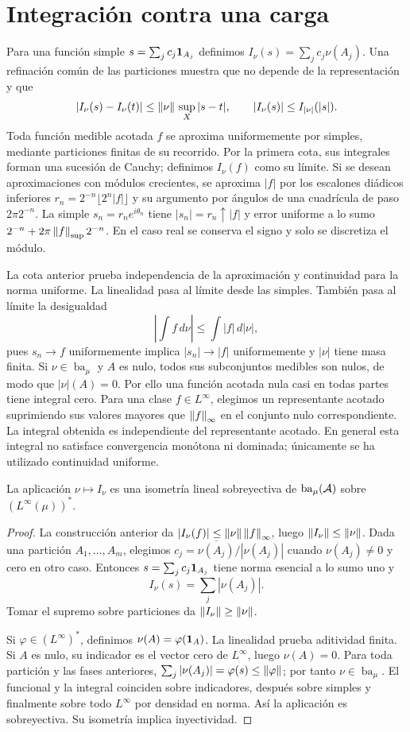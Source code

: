 \section{Integración contra una carga}
Para una función simple $s=\sum_jc_j\mathbf1_{A_j}$ definimos $I_\nu(s)=\sum_jc_j\nu(A_j)$. Una refinación común de las particiones muestra que no depende de la representación y que
\[
 |I_\nu(s)-I_\nu(t)|\le\left\lVert\nu\right\rVert\,\sup_X|s-t|,\qquad
 |I_\nu(s)|\le I_{|\nu|}(|s|).
\]
Toda función medible acotada $f$ se aproxima uniformemente por simples, mediante particiones finitas de su recorrido. Por la primera cota, sus integrales forman una sucesión de Cauchy; definimos $I_\nu(f)$ como su límite. Si se desean aproximaciones con módulos crecientes, se aproxima $|f|$ por los escalones diádicos inferiores $r_n=2^{-n}\lfloor2^n|f|\rfloor$ y su argumento por ángulos de una cuadrícula de paso $2\pi2^{-n}$. La simple $s_n=r_ne^{i\theta_n}$ tiene $|s_n|=r_n\uparrow|f|$ y error uniforme a lo sumo $2^{-n}+2\pi\left\lVert f\right\rVert_{\mathrm{sup}}2^{-n}$. En el caso real se conserva el signo y solo se discretiza el módulo.

La cota anterior prueba independencia de la aproximación y continuidad para la norma uniforme. La linealidad pasa al límite desde las simples. También pasa al límite la desigualdad
\[
 \left|\int f\,d\nu\right|\le\int|f|\,d|\nu|,
\]
pues $s_n\to f$ uniformemente implica $|s_n|\to|f|$ uniformemente y $|\nu|$ tiene masa finita. Si $\nu\in\operatorname{ba}_\mu$ y $A$ es nulo, todos sus subconjuntos medibles son nulos, de modo que $|\nu|(A)=0$. Por ello una función acotada nula casi en todas partes tiene integral cero. Para una clase $f\in L^\infty$, elegimos un representante acotado suprimiendo sus valores mayores que $\left\lVert f\right\rVert_\infty$ en el conjunto nulo correspondiente. La integral obtenida es independiente del representante acotado. En general esta integral no satisface convergencia monótona ni dominada; únicamente se ha utilizado continuidad uniforme.
\begin{teorema}\label{v2:dual-linfty}
La aplicación $\nu\mapsto I_\nu$ es una isometría lineal sobreyectiva de $\operatorname{ba}_\mu(\mathcal A)$ sobre $(L^\infty(\mu))^*$.
\end{teorema}
\begin{proof}
La construcción anterior da $|I_\nu(f)|\le\left\lVert\nu\right\rVert\left\lVert f\right\rVert_\infty$, luego $\left\lVert I_\nu\right\rVert\le\left\lVert\nu\right\rVert$. Dada una partición $A_1,\ldots,A_m$, elegimos $c_j=\overline{\nu(A_j)}/|\nu(A_j)|$ cuando $\nu(A_j)\ne0$ y cero en otro caso. Entonces $s=\sum_jc_j\mathbf1_{A_j}$ tiene norma esencial a lo sumo uno y
\[
 I_\nu(s)=\sum_j|\nu(A_j)|.
\]
Tomar el supremo sobre particiones da $\left\lVert I_\nu\right\rVert\ge\left\lVert\nu\right\rVert$.

Si $\varphi\in(L^\infty)^*$, definimos $\nu(A)=\varphi(\mathbf1_{A})$. La linealidad prueba aditividad finita. Si $A$ es nulo, su indicador es el vector cero de $L^\infty$, luego $\nu(A)=0$. Para toda partición y las fases anteriores,
$\sum_j|\nu(A_j)|=\varphi(s)\le\left\lVert\varphi\right\rVert$; por tanto $\nu\in\operatorname{ba}_\mu$. El funcional y la integral coinciden sobre indicadores, después sobre simples y finalmente sobre todo $L^\infty$ por densidad en norma. Así la aplicación es sobreyectiva. Su isometría implica inyectividad.
\end{proof}


